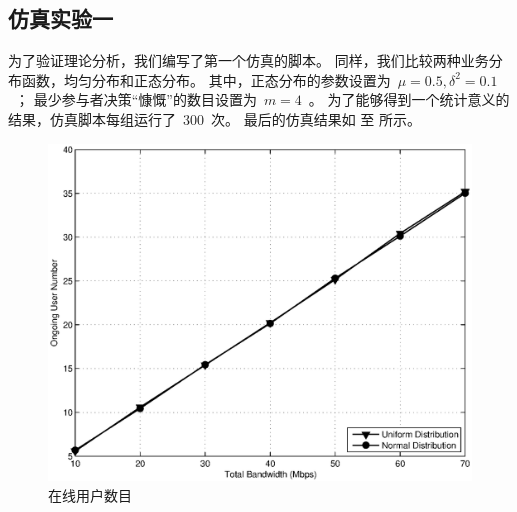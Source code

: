 \subsection{仿真实验一}
为了验证理论分析，我们编写了第一个仿真的脚本。
同样，我们比较两种业务分布函数，均匀分布和正态分布。
其中，正态分布的参数设置为~$\mu = 0.5, \delta^2 = 0.1$~；
最少参与者决策“慷慨”的数目设置为~$m=4$~。
为了能够得到一个统计意义的结果，仿真脚本每组运行了~$300$~次。
最后的仿真结果如
至
所示。
\begin{figure}[!tb] 
    \centering
   \begin{minipage}[t]{0.6\linewidth} 
    \centering 
    \includegraphics[width = \textwidth]{bayesian_normal_bandwidth_vs_user_number} 
    \caption{在线用户数目} 
    \label{fig:chap_bayesian:normal_bandwidth_vs_user_number} 
  \end{minipage}%


\end{figure}
